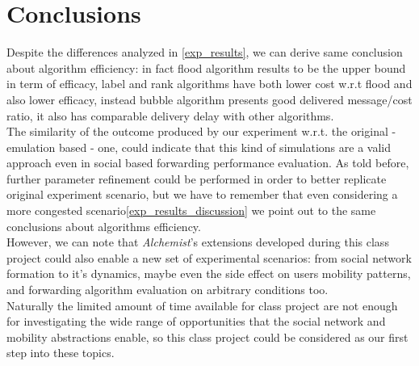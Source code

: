 \section{Conclusions}
\label{conclusions}

Despite the differences analyzed in \ref{exp_results}, we can derive same conclusion about algorithm efficiency: in fact flood algorithm results to be the upper bound in term of efficacy, label and rank algorithms have both lower cost w.r.t flood and also lower efficacy, instead bubble algorithm presents good delivered message/cost ratio, it also has comparable delivery delay with other algorithms.\\
The similarity of the outcome produced by our experiment w.r.t. the original - emulation based - one, could indicate that this kind of simulations are a valid approach even in social based forwarding performance evaluation. As told before, further parameter refinement could be performed in order to better replicate original experiment scenario, but we have to remember that even considering a more congested scenario\ref{exp_results_discussion} we point out to the same conclusions about algorithms efficiency.\\
However, we can note that \emph{Alchemist}'s extensions developed during this class project could also enable a new set of experimental scenarios: from social network formation to it's dynamics, maybe even the side effect on users mobility patterns, and forwarding algorithm evaluation on arbitrary conditions too.\\
Naturally the limited amount of time available for class project are not enough for investigating the wide range of opportunities that the social network and mobility abstractions enable, so this class project could be considered as our first step into these topics.  
